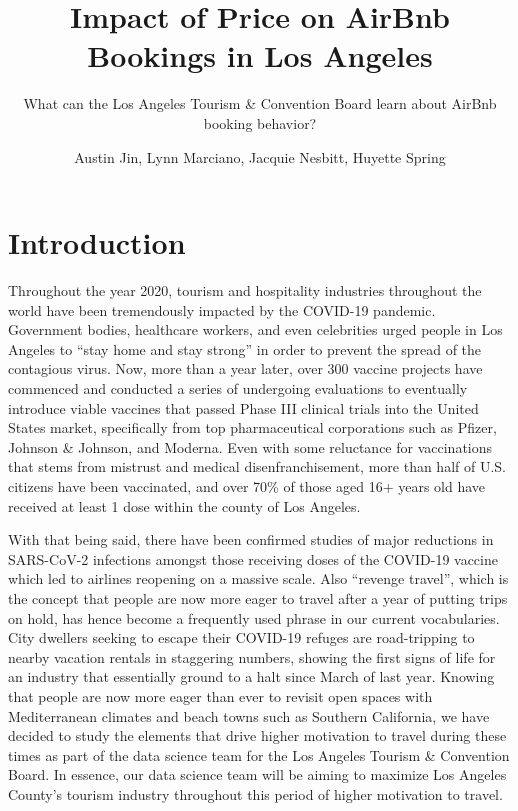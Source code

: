 \documentclass[
]{article}
\title{Impact of Price on AirBnb Bookings in Los Angeles}
\subtitle{What can the Los Angeles Tourism \& Convention Board learn about AirBnb booking behavior?}
\author{Austin Jin, Lynn Marciano, Jacquie Nesbitt, Huyette Spring}
\date{}
\begin{document}
\maketitle

{
\setcounter{tocdepth}{2}
\tableofcontents
}
\clearpage

\hypertarget{introduction}{%
\section{Introduction}\label{introduction}}

Throughout the year 2020, tourism and hospitality industries throughout the world have been tremendously impacted by the COVID-19 pandemic. Government bodies, healthcare workers, and even celebrities urged people in Los Angeles to ``stay home and stay strong'' in order to prevent the spread of the contagious virus. Now, more than a year later, over 300 vaccine projects have commenced and conducted a series of undergoing evaluations to eventually introduce viable vaccines that passed Phase III clinical trials into the United States market, specifically from top pharmaceutical corporations such as Pfizer, Johnson \& Johnson, and Moderna. Even with some reluctance for vaccinations that stems from mistrust and medical disenfranchisement, more than half of U.S. citizens have been vaccinated, and over 70\% of those aged 16+ years old have received at least 1 dose within the county of Los Angeles.

With that being said, there have been confirmed studies of major reductions in SARS-CoV-2 infections amongst those receiving doses of the COVID-19 vaccine which led to airlines reopening on a massive scale. Also ``revenge travel'', which is the concept that people are now more eager to travel after a year of putting trips on hold, has hence become a frequently used phrase in our current vocabularies. City dwellers seeking to escape their COVID-19 refuges are road-tripping to nearby vacation rentals in staggering numbers, showing the first signs of life for an industry that essentially ground to a halt since March of last year. Knowing that people are now more eager than ever to revisit open spaces with Mediterranean climates and beach towns such as Southern California, we have decided to study the elements that drive higher motivation to travel during these times as part of the data science team for the Los Angeles Tourism \& Convention Board. In essence, our data science team will be aiming to maximize Los Angeles County's tourism industry throughout this period of higher motivation to travel.
\end{document}
